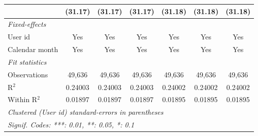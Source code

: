 \begin{table}[htbp]
\begin{footnotesize}
\begin{tabular}{lcccccc}
                                          & (31.17)       & (31.17)       & (31.17)       & (31.18)       & (31.18)       & (31.18)\\
         \midrule \emph{Fixed-effects} &   &   &   &   &   &  \\
         User id                          & Yes           & Yes           & Yes           & Yes           & Yes           & Yes\\
         Calendar month                   & Yes           & Yes           & Yes           & Yes           & Yes           & Yes\\
         \midrule \emph{Fit statistics} &   &   &   &   &   &  \\
         Observations                     & 49,636        & 49,636        & 49,636        & 49,636        & 49,636        & 49,636\\
         R$^2$                            & 0.24003       & 0.24003       & 0.24003       & 0.24002       & 0.24002       & 0.24002\\
         Within R$^2$                     & 0.01897       & 0.01897       & 0.01897       & 0.01895       & 0.01895       & 0.01895\\
         \midrule\midrule\multicolumn{7}{l}{\emph{Clustered (User id) standard-errors in parentheses}}\\
         \multicolumn{7}{l}{\emph{Signif. Codes: ***: 0.01, **: 0.05, *: 0.1}}\\
      \end{tabular}
   \end{footnotesize}
\end{table}


